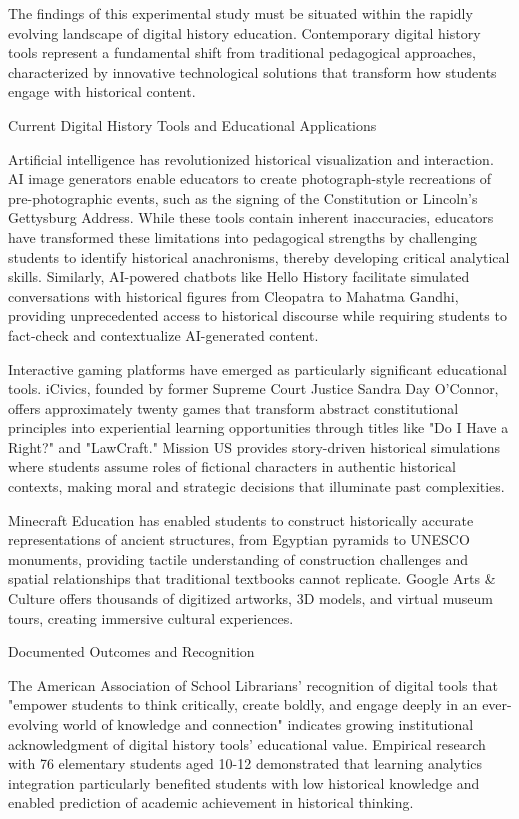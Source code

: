 

The findings of this experimental study must be situated within the rapidly evolving landscape of digital history education. Contemporary digital history tools represent a fundamental shift from traditional pedagogical approaches, characterized by innovative technological solutions that transform how students engage with historical content.

 Current Digital History Tools and Educational Applications

Artificial intelligence has revolutionized historical visualization and interaction. AI image generators enable educators to create photograph-style recreations of pre-photographic events, such as the signing of the Constitution or Lincoln's Gettysburg Address. While these tools contain inherent inaccuracies, educators have transformed these limitations into pedagogical strengths by challenging students to identify historical anachronisms, thereby developing critical analytical skills. Similarly, AI-powered chatbots like Hello History facilitate simulated conversations with historical figures from Cleopatra to Mahatma Gandhi, providing unprecedented access to historical discourse while requiring students to fact-check and contextualize AI-generated content.

Interactive gaming platforms have emerged as particularly significant educational tools. iCivics, founded by former Supreme Court Justice Sandra Day O'Connor, offers approximately twenty games that transform abstract constitutional principles into experiential learning opportunities through titles like "Do I Have a Right?" and "LawCraft." Mission US provides story-driven historical simulations where students assume roles of fictional characters in authentic historical contexts, making moral and strategic decisions that illuminate past complexities.

Minecraft Education has enabled students to construct historically accurate representations of ancient structures, from Egyptian pyramids to UNESCO monuments, providing tactile understanding of construction challenges and spatial relationships that traditional textbooks cannot replicate. Google Arts & Culture offers thousands of digitized artworks, 3D models, and virtual museum tours, creating immersive cultural experiences.

  Documented Outcomes and Recognition

The American Association of School Librarians' recognition of digital tools that "empower students to think critically, create boldly, and engage deeply in an ever-evolving world of knowledge and connection" indicates growing institutional acknowledgment of digital history tools' educational value. Empirical research with 76 elementary students aged 10-12 demonstrated that learning analytics integration particularly benefited students with low historical knowledge and enabled prediction of academic achievement in historical thinking.

